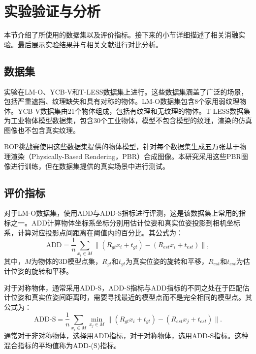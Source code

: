 \section{实验验证与分析}\label{sec:exp}

本节介绍了所使用的数据集以及评价指标。接下来的小节详细描述了相关消融实验。最后展示实验结果并与相关文献进行对比分析。

\subsection{数据集}
实验在LM-O\cite{lmo}、YCB-V\cite{ycbv}和T-LESS\cite{tless}数据集上进行。这些数据集涵盖了广泛的场景，包括严重遮挡、纹理缺失和具有对称的物体。LM-O数据集包含8个家用弱纹理物体。YCB-V数据集由21个物体组成，包括有纹理和无纹理的物体。T-LESS数据集为工业物体模型数据集，包含30个工业物体，模型不包含模型的纹理，渲染的仿真图像也不包含真实纹理。

BOP挑战赛\cite{Sundermeyer2023BOPC2}使用这些数据集提供的物体模型，针对每个数据集生成五万张基于物理渲染（Physically-Based Rendering，PBR）合成图像。本研究采用这些PBR图像进行训练，但在数据集提供的真实场景中进行测试。

\subsection{评价指标}\label{subsec:评价指标}

\par 对于LM-O数据集，使用ADD与ADD-S指标进行评测，这是该数据集上常用的指标之一。ADD计算物体坐标系坐标分别用估计位姿和真实位姿投影到相机坐标系，计算对应投影点间距离在阈值内的百分比。其公式为：
\begin{equation}
  \text{ADD} = \frac{1}{n}\sum_{x_i \in M} \| (R_{gt}x_i + t_{gt}) - (R_{est}x_i + t_{est}) \|,
\end{equation}
其中，$M$为物体的3D模型点集，$R_{gt}$和$t_{gt}$为真实位姿的旋转和平移，$R_{est}$和$t_{est}$为估计位姿的旋转和平移。

\par 对于对称物体，通常采用ADD-S，ADD-S指标与ADD指标的不同之处在于匹配估计位姿和真实位姿间距离时，需要寻找最近的模型点而不是完全相同的模型点。其公式为：
\begin{equation}
  \text{ADD-S} = \frac{1}{n}\sum_{x_i \in M} \min\limits_{x_j \in M} \| (R_{gt}x_i + t_{gt}) - (R_{est}x_j + t_{est}) \|.
\end{equation}
通常对于非对称物体，选择用ADD指标，对于对称物体，选用ADD-S指标。这种混合指标的平均值称为ADD-(S)指标。

